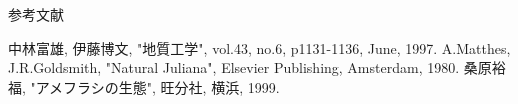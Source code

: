 参考文献



\begin{thebibliography}{9}
\bibitem{} 中林富雄, 伊藤博文, "地質工学", vol.43, no.6,
  p1131-1136, June, 1997.
\bibitem{} A.Matthes, J.R.Goldsmith, "Natural Juliana", Elsevier
  Publishing, Amsterdam, 1980.
\bibitem{} 桑原裕福, "アメフラシの生態", 旺分社, 横浜, 1999.
\end{thebibliography}